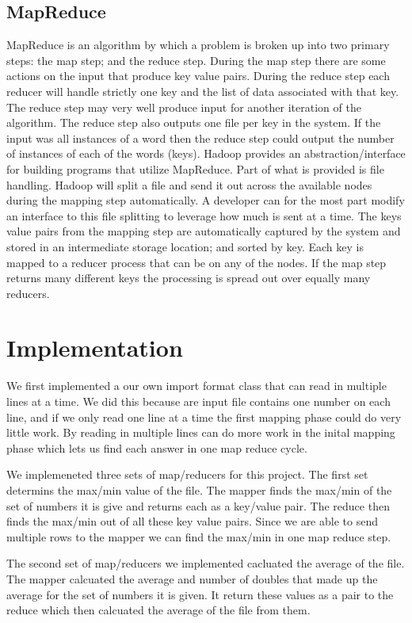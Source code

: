 \documentclass[11pt]{article}
\begin{document}
\subsection{MapReduce}
MapReduce is an algorithm by which a problem is broken up into two primary steps: the map step; and the reduce step.  During the map step there are some actions on the input that produce key value pairs.  During the reduce step each reducer will handle strictly one key and the list of data associated with that key.  The reduce step may very well produce input for another iteration of the algorithm.  The reduce step also outputs one file per key in the system.  If the input was all instances of a word then the reduce step could output the number of instances of each of the words (keys).  Hadoop provides an abstraction/interface for building programs that utilize MapReduce.  Part of what is provided is file handling.  Hadoop will split a file and send it out across the available nodes during the mapping step automatically.  A developer can for the most part modify an interface to this file splitting to leverage how much is sent at a time.  The keys value pairs from the mapping step are automatically captured by the system and stored in an intermediate storage location; and sorted by key.  Each key is mapped to a reducer process that can be on any of the nodes.  If the map step returns many different keys the processing is spread out over equally many reducers.

\section{Implementation}
We first implemented a our own import format class that can read in multiple lines at a time.  We did this because are input file contains one number on each line, and if we only read one line at a time the first mapping phase could do very little work.  By reading in multiple lines can do more work in the inital mapping phase which lets us find each answer in one map reduce cycle.

We implemeneted three sets of map/reducers for this project.  The first set determins the max/min value of the file.  The mapper finds the max/min of the set of numbers it is give and returns each as a key/value pair.  The reduce then finds the max/min out of all these key value pairs.  Since we are able to send multiple rows to the mapper we can find the max/min in one map reduce step.  

The second set of map/reducers we implemented cacluated the average of the file.  The mapper calcuated the average and number of doubles that made up the average for the set of numbers it is given.  It return these values as a pair to the reduce which then calcuated the average of the file from them.   
\end{document}
